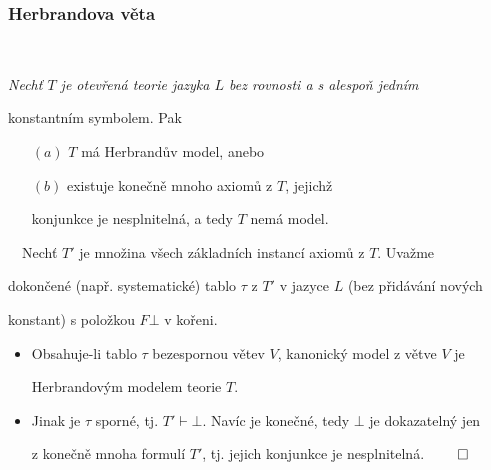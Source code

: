 \subsubsection*{Herbrandova věta}
    {\bf {}}\ \ {\it Nechť $T$ je otevřená teorie jazyka $L$ bez rovnosti a s alespoň jedním
    \vspace{0.5mm}
    
    konstantním symbolem. Pak
    
    
    \begin{enumerate}
    \item[$(a)$] $T$ má Herbrandův model, anebo
    \item[$(b)$] existuje konečně mnoho  axiomů z $T$, jejichž
    \vspace{0.5mm}
    
    konjunkce je nesplnitelná, a tedy $T$ nemá model.
    \end{enumerate}}
    
    \smallskip
    
    {\it {}}\ \ Nechť $T'$ je množina všech základních instancí axiomů z $T$. Uvažme
    \vspace{0.5mm}
    
    dokončené (např. systematické) tablo $\tau$ z $T'$ v jazyce $L$ (bez přidávání nových
    \vspace{0.5mm}
    
     konstant) s položkou $F\bot$ v kořeni.
    
    \begin{itemize}
    \item Obsahuje-li tablo $\tau$ bezespornou větev $V$, kanonický model z větve $V$ je
    \vspace{0.5mm}
    
    Herbrandovým modelem teorie $T$.
    
    \item Jinak je $\tau$ sporné, tj. $T' \vdash \bot$. Navíc je konečné, tedy $\bot$ je dokazatelný jen
    \vspace{0.5mm}
    
    z konečně mnoha formulí $T'$, tj. jejich konjunkce je nesplnitelná. $\qed$
    \end{itemize}
    \smallskip
    
